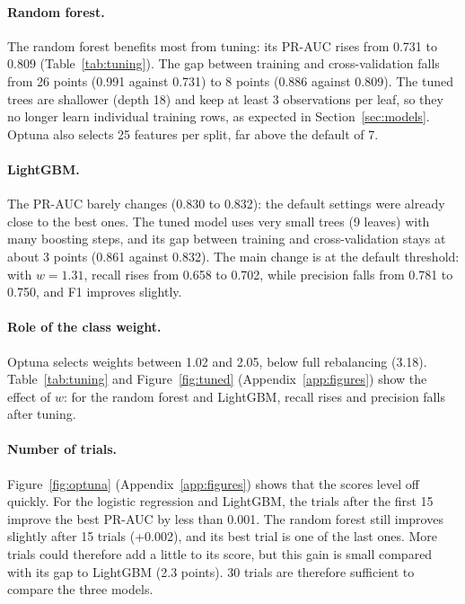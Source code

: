 \documentclass[10pt,a4paper]{article}
\begin{document}
\paragraph{Random forest.}
The random forest benefits most from tuning: its PR-AUC rises from 0.731 to 0.809
(Table~\ref{tab:tuning}). The gap between training and cross-validation falls from
26 points (0.991 against 0.731) to 8 points (0.886 against 0.809). The tuned trees are
shallower (depth 18) and keep at least 3 observations per leaf, so they no longer learn
individual training rows, as expected in Section~\ref{sec:models}. Optuna also selects
25 features per split, far above the default of 7.

\paragraph{LightGBM.}
The PR-AUC barely changes (0.830 to 0.832): the default settings were already close to the
best ones. The tuned model uses very small trees (9 leaves) with many boosting steps, and
its gap between training and cross-validation stays at about 3 points (0.861 against
0.832). The main change is at the default threshold: with $w = 1.31$, recall rises from
0.658 to 0.702, while precision falls from 0.781 to 0.750, and F1 improves slightly.

\paragraph{Role of the class weight.}
Optuna selects weights between 1.02 and 2.05, below full rebalancing (3.18).
Table~\ref{tab:tuning} and Figure~\ref{fig:tuned} (Appendix~\ref{app:figures}) show the effect of $w$: for the random forest and LightGBM,
recall rises and precision falls after tuning.

\paragraph{Number of trials.}
Figure~\ref{fig:optuna} (Appendix~\ref{app:figures}) shows that the scores level off quickly. For the logistic
regression and LightGBM, the trials after the first 15 improve the best PR-AUC by less
than 0.001. The random forest still improves slightly after 15 trials (+0.002), and its
best trial is one of the last ones. More trials could therefore add a little to its
score, but this gain is small compared with its gap to LightGBM (2.3 points). 
30 trials are therefore sufficient to compare the three models.
\end{document}
